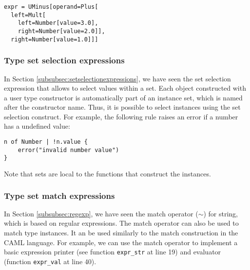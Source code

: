 \documentclass[11pt]{article}
\begin{document}
\begin{lstlisting}
expr = UMinus[operand=Plus[
  left=Mult[
    left=Number[value=3.0],
    right=Number[value=2.0]],
  right=Number[value=1.0]]]
\end{lstlisting}

\subsubsection{Type set selection expressions}

In Section \ref{subsubsec:setselectionexpressions}, we have seen the set selection expression that allows to select values within a set. Each object constructed with a user type constructor is automatically part of an instance set, which is named after the constructor name. Thus, it is possible to select instances using the set selection construct. For example, the following rule raises an error if a number has a undefined value:

\begin{lstlisting}[numbers=none]
n of Number | !n.value {
    error("invalid number value")
}
\end{lstlisting}

Note that sets are local to the functions that construct the instances.

\subsubsection{Type set match expressions}

In Section \ref{subsubsec:regexp}, we have seen the match operator ($\sim$) for string, which is based on regular expressions. The match operator can also be used to match type instances. It an be used similarly to the match construction in the CAML language. For example, we can use the match operator to implement a basic expression printer (see function \texttt{expr\_str} at line 19) and evaluator (function \texttt{expr\_val} at line 40).
\end{document}
